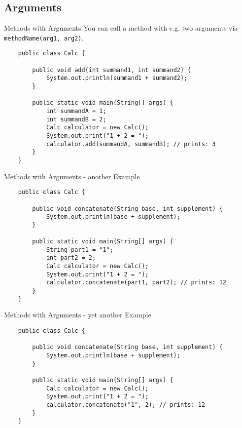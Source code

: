 \subsection{Arguments}
\begin{frame}[fragile]{Methods with Arguments}
	You can call a method with e.g. two arguments via \texttt{methodName(arg1, arg2)}.
	\begin{lstlisting}
	public class Calc {
	
	    public void add(int summand1, int summand2) {
	        System.out.println(summand1 + summand2);
	    }
	    
	    public static void main(String[] args) {
	        int summandA = 1;
	        int summandB = 2;
	        Calc calculator = new Calc();
	        System.out.print("1 + 2 = ");
	        calculator.add(summandA, summandB); // prints: 3
	    }
	}
	\end{lstlisting}
\end{frame}

\begin{frame}[fragile]{Methods with Arguments - another Example}
	\begin{lstlisting}
	public class Calc {
	
	    public void concatenate(String base, int supplement) {
	        System.out.println(base + supplement);
	    }
	    
	    public static void main(String[] args) {
	        String part1 = "1";
	        int part2 = 2;
	        Calc calculator = new Calc();
	        System.out.print("1 + 2 = ");
	        calculator.concatenate(part1, part2); // prints: 12
	    }
	}
	\end{lstlisting}
\end{frame}

\begin{frame}[fragile]{Methods with Arguments - yet another Example}
	\begin{lstlisting}
	public class Calc {
	
	    public void concatenate(String base, int supplement) {
	        System.out.println(base + supplement);
	    }
	    
	    public static void main(String[] args) {
	        Calc calculator = new Calc();
	        System.out.print("1 + 2 = ");
	        calculator.concatenate("1", 2); // prints: 12
	    }
	}
	\end{lstlisting}
\end{frame}


